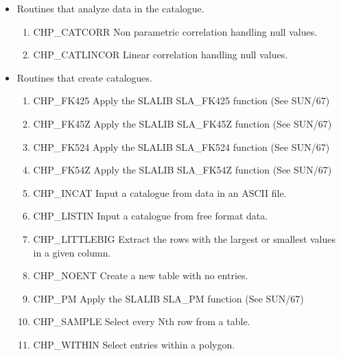 \begin{itemize}

\item Routines that analyze data in the catalogue.

 \begin{enumerate}

  \item CHP\_CATCORR Non parametric correlation handling null values.

  \item CHP\_CATLINCOR Linear correlation handling null values.

 \end{enumerate}

\item Routines that create catalogues.

 \begin{enumerate}

  \item CHP\_FK425 Apply the SLALIB SLA\_FK425 function (See SUN/67)

  \item CHP\_FK45Z Apply the SLALIB SLA\_FK45Z function (See SUN/67)

  \item CHP\_FK524 Apply the SLALIB SLA\_FK524 function (See SUN/67)

  \item CHP\_FK54Z Apply the SLALIB SLA\_FK54Z function (See SUN/67)

  \item CHP\_INCAT Input a catalogue from data in an ASCII file.

  \item CHP\_LISTIN Input a catalogue from free format data.

  \item CHP\_LITTLEBIG Extract the rows with the largest or smallest values in
a given column.

  \item CHP\_NOENT Create a new table with no entries.

  \item CHP\_PM Apply the SLALIB SLA\_PM function (See SUN/67)

  \item CHP\_SAMPLE Select every Nth row from a table.

  \item CHP\_WITHIN Select entries within a polygon.

 \end{enumerate}


\end{itemize}
